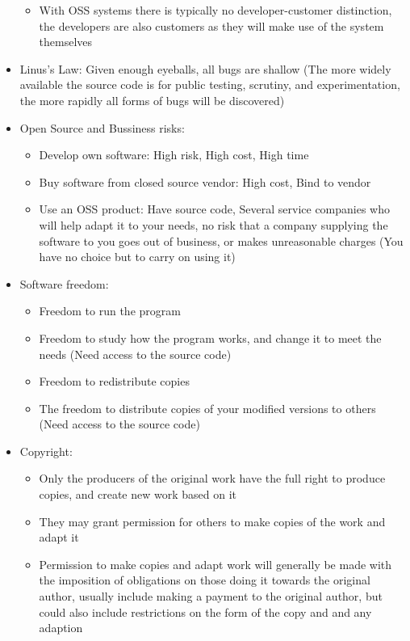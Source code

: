 \documentclass[12pt,openany]{book}
\begin{document}
\begin{itemize}
\begin{itemize}
        \item With OSS systems there is typically no developer-customer distinction, the developers are also customers as they will make use of the system themselves
    \end{itemize}
    \item Linus's Law: Given enough eyeballs, all bugs are shallow (The more widely available the source code is for public testing, scrutiny, and experimentation, the more rapidly all forms of bugs will be discovered)
    \item Open Source and Bussiness risks:
    \begin{itemize}
        \item Develop own software: High risk, High cost, High time
        \item Buy software from closed source vendor: High cost, Bind to vendor
        \item Use an OSS product: Have source code, Several service companies who will help adapt it to your needs, no risk that a company supplying the software to you goes out of business, or makes unreasonable charges (You have no choice but to carry on using it)
    \end{itemize}
    \item Software freedom: 
    \begin{itemize}
        \item Freedom to run the program
        \item Freedom to study how the program works, and change it to meet the needs (Need access to the source code)
        \item Freedom to redistribute copies
        \item The freedom to distribute copies of your modified versions to others (Need access to the source code)
    \end{itemize}
    \item Copyright: 
    \begin{itemize}
        \item Only the producers of the original work have the full right to produce copies, and create new work based on it
        \item They may grant permission for others to make copies of the work and adapt it
        \item Permission to make copies and adapt work will generally be made with the imposition of obligations on those doing it towards the original author, usually include making a payment to the original author, but could also include restrictions on the form of the copy and and any adaption

\end{itemize}
\end{itemize}
\end{document}
